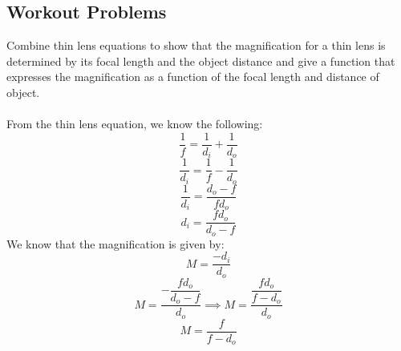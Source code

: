 \documentclass[12pt,addpoints]{exam}
\begin{document}
{{{\begin{questions}
					\subsection*{Workout Problems}
					\question Combine thin lens equations to show that the magnification for a thin lens is determined by its focal length and the object distance and give a function that expresses the magnification as a function of the focal 	length and distance of object. \\ \\
					From the thin lens equation, we know the following:
					$$\dfrac{1}{f}=\dfrac{1}{d_i}+\dfrac{1}{d_o}$$
					$$\dfrac{1}{d_i}=\dfrac{1}{f}-\dfrac{1}{d_o}$$
					$$\dfrac{1}{d_i}=\dfrac{d_o-f}{fd_o}$$
					$$d_i=\dfrac{fd_o}{d_o-f}$$
					We know that the magnification is given by:
					$$M=\dfrac{-d_i}{d_o}$$
					$$M=\dfrac{-\dfrac{fd_o}{d_o-f}}{d_o}\implies M=\dfrac{\dfrac{fd_o}{f-d_o}}{d_o}$$
					$$M=\dfrac{f}{f-d_o}$$
					

\end{questions}}}}
\end{document}
